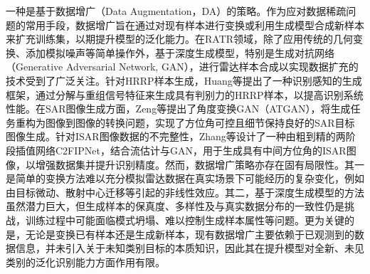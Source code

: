 一种是基于数据增广（Data Augmentation，DA）的策略。作为应对数据稀疏问题的常用手段，数据增广旨在通过对现有样本进行变换或利用生成模型合成新样本来扩充训练集，以期提升模型的泛化能力。在RATR领域，除了应用传统的几何变换、添加模拟噪声等简单操作外，基于深度生成模型，特别是生成对抗网络（Generative Adversarial Network, GAN），进行雷达样本合成以实现数据扩充的技术受到了广泛关注。针对HRRP样本生成，Huang等提出了一种识别感知的生成框架，通过分解与重组信号特征来生成具有判别力的HRRP样本，以提高识别系统性能。在SAR图像生成方面，Zeng等提出了角度变换GAN（ATGAN），将生成任务重构为图像到图像的转换问题，实现了方位角可控且细节保持良好的SAR目标图像生成。针对ISAR图像数据的不完整性，Zhang等设计了一种由粗到精的两阶段插值网络C2FIPNet，结合流估计与GAN，用于生成具有中间方位角的ISAR图像，以增强数据集并提升识别精度。然而，数据增广策略亦存在固有局限性。其一是简单的变换方法难以充分模拟雷达数据在真实场景下可能经历的复杂变化，例如由目标微动、散射中心迁移等引起的非线性效应。其二，基于深度生成模型的方法虽然潜力巨大，但生成样本的保真度、多样性及与真实数据分布的一致性仍是挑战，训练过程中可能面临模式坍塌、难以控制生成样本属性等问题。更为关键的是，无论是变换已有样本还是生成新样本，现有数据增广主要依赖于已观测到的数据信息，并未引入关于未知类别目标的本质知识，因此其在提升模型对全新、未见类别的泛化识别能力方面作用有限。

